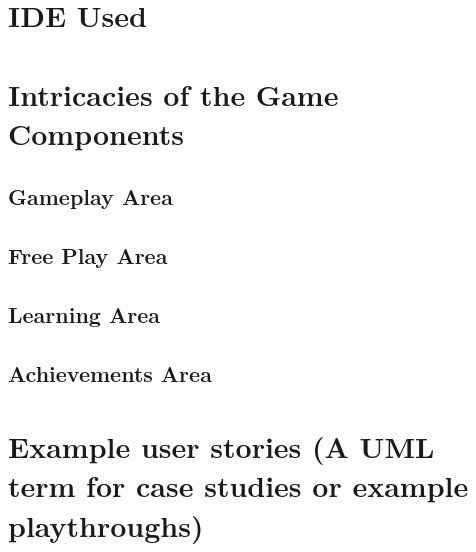 	
	\section{IDE Used}
	\label{sec:ide_used}
	
	\section{Intricacies of the Game Components}
	\label{sec:packages_used}
	
	\subsection{Gameplay Area}
	
	\subsection{Free Play Area}
	
	\subsection{Learning Area}
	
	\subsection{Achievements Area}
	
	
	\section{Example user stories (A UML term for case studies or example playthroughs)}
	\label{sec:ide_used}
	
	
	
